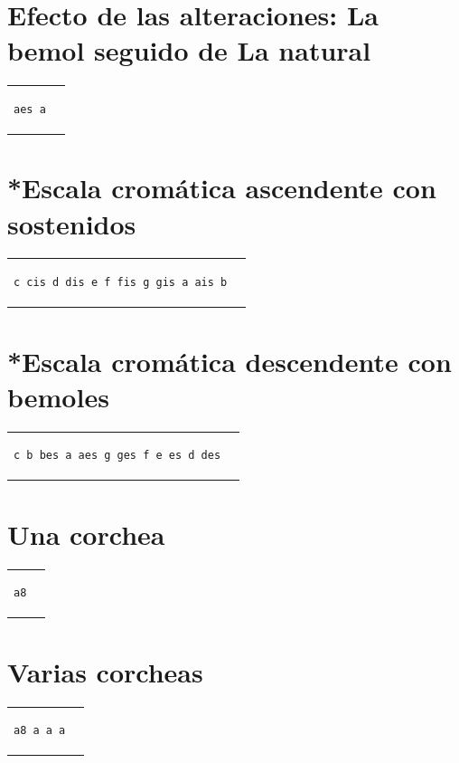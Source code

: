\documentclass[a4paper,10pt,oneside,headinclude,titlepage]{article} %
\begin{document}
\section*{Efecto de las alteraciones: La bemol seguido de La natural}
\begin{tabular}{m{2cm}m{2cm}}
\begin{verbatim}
aes a
\end{verbatim}
&
\begin[fragment,relative=2,notime]{lilypond}
aes a
\end{lilypond}
\end{tabular}

\section*{*Escala cromática ascendente con sostenidos}
\begin{tabular}{m{6cm}m{2cm}}
\begin{verbatim}
c cis d dis e f fis g gis a ais b
\end{verbatim}
&
\begin[fragment,relative=1,notime]{lilypond}
c cis d dis e f fis g gis a ais b
\end{lilypond}
\end{tabular}

\section*{*Escala cromática descendente con bemoles}
\begin{tabular}{m{6cm}m{2cm}}
\begin{verbatim}
c b bes a aes g ges f e es d des
\end{verbatim}
&
\begin[fragment,relative=2,notime]{lilypond}
c b bes a aes g ges f e es d des
\end{lilypond}
\end{tabular}

\section*{Una corchea}
\begin{tabular}{m{2cm}m{2cm}}
\begin{verbatim}
a8
\end{verbatim}
&
\begin[fragment,relative=2,notime]{lilypond}
a8
\end{lilypond}
\end{tabular}

\section*{Varias corcheas}
\begin{tabular}{m{2cm}m{2cm}}
\begin{verbatim}
a8 a a a
\end{verbatim}
&
\begin[fragment,relative=2,notime]{lilypond}
a8 a a a
\end{lilypond}
\end{tabular}
\end{document}
